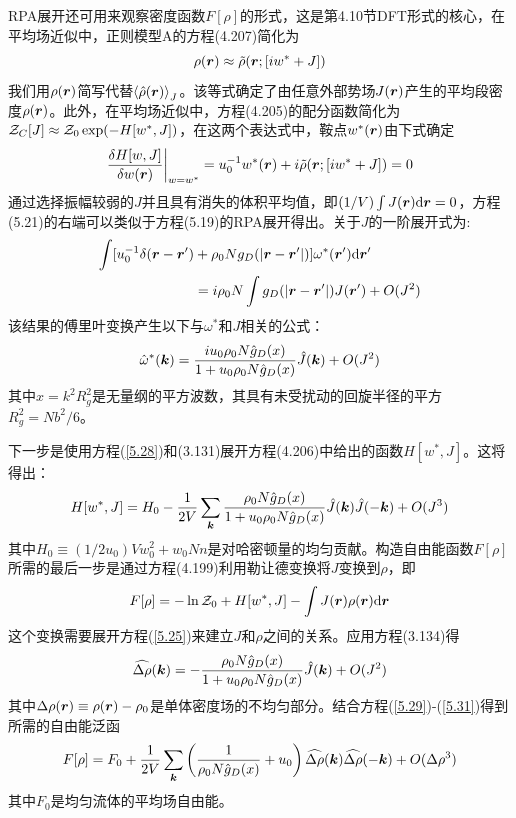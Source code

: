 RPA展开还可用来观察密度函数$F[\rho]$的形式，这是第4.10节DFT形式的核心，在平均场近似中，正则模型A的方程(4.207)简化为
\begin{equation}\label{5.25}
\rho(\bm{r})\approx\tilde{\rho}(\bm{r};[iw^*+J])
\end{equation}
我们用$\rho(\bm{r})$简写代替$\left\langle\hat{\rho}(\bm{r})\right\rangle_J$。该等式确定了由任意外部势场$J(\bm{r})$产生的平均段密度$\rho(\bm{r})$。此外，在平均场近似中，方程(4.205)的配分函数简化为$\mathcal{Z}_C[J]\approx\mathcal{Z}_0\exp(-H[w^*,J])$，在这两个表达式中，鞍点$w^*(\bm{r})$由下式确定
\begin{equation}\label{5.26}
\frac{\delta H[w,J]}{\delta w(\bm{r})}\bigg|_{w=w^*}=u_0^{-1}w^*(\bm{r})+i\tilde{\rho}(\bm{r};[iw^*+J])=0
\end{equation}
通过选择振幅较弱的$J$并且具有消失的体积平均值，即$(1/V)\int J(\bm{r})\mathrm{d}\bm{r}=0$，方程(5.21)的右端可以类似于方程(5.19)的RPA展开得出。关于$J$的一阶展开式为:
\begin{equation}
\begin{aligned}
\int[u_0^{-1}\delta(\bm{r}-\bm{r}')&+\rho_0Ng_D(\left|\bm{r}-\bm{r}'\right|)]\omega^*(\bm{r}')\mathrm{d}\bm{r}'\\
&=i\rho_0N\int g_D(\left|\bm{r}-\bm{r}'\right|)J(\bm{r}')+O(J^2)
\end{aligned}
\end{equation}
该结果的傅里叶变换产生以下与$\omega^*$和$J$相关的公式：
\begin{equation}\label{5.28}
\hat{\omega}^*(\bm{k})=\frac{iu_0\rho_0N\hat{g}_D(x)}{1+u_0\rho_0N\hat{g}_D(x)}\hat{J}(\bm{k})+O(J^2)
\end{equation}
其中$x=k^2R_g^2$是无量纲的平方波数，其具有未受扰动的回旋半径的平方$R_g^2=Nb^2/6$。

下一步是使用方程(\ref{5.28})和(3.131)展开方程(4.206)中给出的函数$H[w^*,J]$。这将得出：
\begin{equation}\label{5.29}
H[w^*,J]=H_0-\frac{1}{2V}\sum\limits_{\bm{k}}\frac{\rho_0N\hat{g}_D(x)}{1+u_0\rho_0N\hat{g}_D(x)}\hat{J}(\bm{k})\hat{J}(-\bm{k})+O(J^3)
\end{equation}
其中$H_0\equiv(1/2u_0)Vw_0^2+w_0Nn$是对哈密顿量的均匀贡献。构造自由能函数$F[\rho]$所需的最后一步是通过方程(4.199)利用勒让德变换将$J$变换到$\rho$，即
\begin{equation}\label{5.30}
F[\rho]=-\ln\mathcal{Z}_0+H[w^*,J]-\int J(\bm{r})\rho(\bm{r})\mathrm{d}\bm{r}
\end{equation}
这个变换需要展开方程(\ref{5.25})来建立$J$和$\rho$之间的关系。应用方程(3.134)得
\begin{equation}\label{5.31}
\widehat{\Delta\rho}(\bm{k})=-\frac{\rho_0N\hat{g}_D(x)}{1+u_0\rho_0N\hat{g}_D(x)}\hat{J}(\bm{k})+O(J^2)
\end{equation}
其中$\Delta\rho(\bm{r})\equiv\rho(\bm{r})-\rho_0$是单体密度场的不均匀部分。结合方程(\ref{5.29})-(\ref{5.31})得到所需的自由能泛函
\begin{equation}\label{5.32}
F[\rho]=F_0+\frac{1}{2V}\sum\limits_{\bm{k}}\left(\frac{1}{\rho_0N\hat{g}_D(x)}+u_0\right)\widehat{\Delta\rho}(\bm{k})\widehat{\Delta\rho}(-\bm{k})+O(\Delta\rho^3)
\end{equation}
其中$F_0$是均匀流体的平均场自由能。

